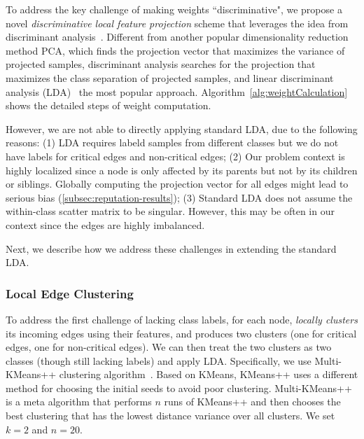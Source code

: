 To address the key challenge of making weights ``discriminative", we propose a novel \emph{discriminative local feature projection} scheme that leverages the idea from discriminant analysis~\cite{mlbook}. Different from another popular dimensionality reduction method PCA, which finds the projection vector that maximizes the variance of projected samples, discriminant analysis searches for the projection that maximizes the class separation of projected samples, and linear discriminant analysis (LDA)~\cite{Mika99fisherdiscriminant} the most popular approach.
Algorithm~\ref{alg:weightCalculation} shows the detailed steps of weight computation.

However, we are not able to directly applying standard LDA, due to the following reasons:
(1) LDA requires labeld samples from different classes but we do not have labels for critical edges and non-critical edges;
(2) Our problem context is highly localized since a node is only affected by its parents but not by its children or siblings. Globally computing the projection vector for all edges might lead to serious bias (\cref{subsec:reputation-results});
(3) Standard LDA does not assume the within-class scatter matrix to be singular. However, this may be often in our context since the edges are highly imbalanced.


Next, we describe how we address these challenges in extending the standard LDA.

\subsubsection{Local Edge Clustering}
To address the first challenge of lacking class labels, for each node, \tool \emph{locally clusters} its incoming edges using their features, and produces two clusters (one for critical edges, one for non-critical edges). We can then treat the two clusters as two classes (though still lacking labels) and apply LDA. Specifically, we use Multi-KMeans++ clustering algorithm~\cite{Arthur:2007:KAC:1283383.1283494}.
Based on KMeans, KMeans++ uses a different method for choosing the initial seeds to avoid poor clustering.
Multi-KMeans++ is a meta algorithm that performs $n$ runs of KMeans++ and then chooses the best clustering that has the lowest distance variance over all clusters. We set $k=2$ and $n=20$.


